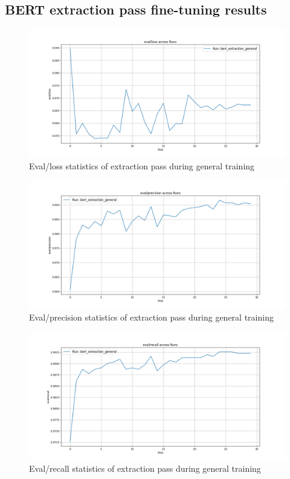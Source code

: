 \documentclass[licencjacka,en]{pracamgr}
\begin{document}
\begin{appendices}
\chapter{BERT extraction pass fine-tuning results} \label{AppD}
\begin{figure}[h]
    \centering
    \includegraphics[width=0.8\linewidth]{bachelor_images/e_elg.png}
    \caption{Eval/loss statistics of extraction pass during general training}
    \label{fig:e_elg}
\end{figure}
\begin{figure}[h]
    \centering
    \includegraphics[width=0.8\linewidth]{bachelor_images/e_epg.png}
    \caption{Eval/precision statistics of extraction pass during general training}
    \label{fig:e_epg}
\end{figure}
\begin{figure}[h]
    \centering
    \includegraphics[width=0.8\linewidth]{bachelor_images/e_erg.png}
    \caption{Eval/recall statistics of extraction pass during general training}
    \label{fig:e_erg}
\end{figure}


\end{appendices}
\end{document}
